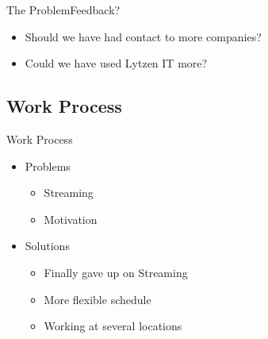 \begin{frame}{The Problem}{Feedback?}
    \begin{itemize}
        \item Should we have had contact to more companies?
        \item Could we have used Lytzen IT more?
    \end{itemize}
\end{frame}

\subsection{Work Process}
\begin{frame}{Work Process}
    \begin{itemize}
        \item Problems
        \begin{itemize}
            \item Streaming
            \item Motivation
        \end{itemize}
        \item Solutions
        \begin{itemize}
            \item Finally gave up on Streaming
            \item More flexible schedule
            \item Working at several locations
        \end{itemize}
    \end{itemize}
\end{frame}
